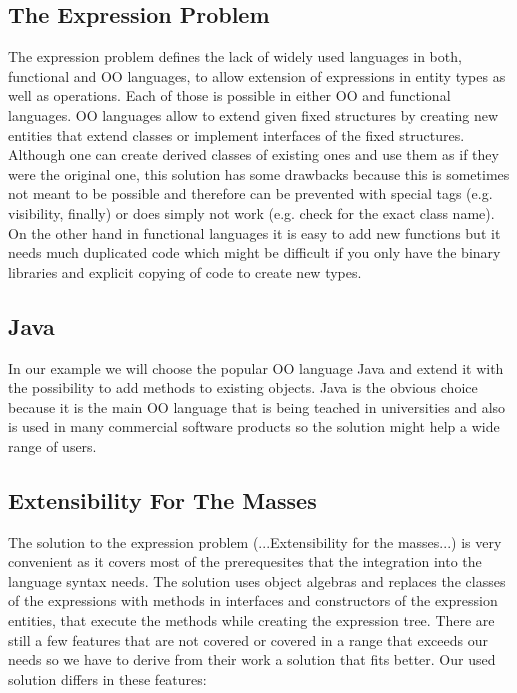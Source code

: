 \documentclass{report}
\begin{document}
\subsection{The Expression Problem}

The expression problem defines the lack of widely used languages in both, functional and OO languages, to allow extension of expressions in entity types as well as operations. Each of those is possible in either OO and functional languages. OO languages allow to extend given fixed structures by creating new entities that extend classes or implement interfaces of the fixed structures. Although one can create derived classes of existing ones and use them as if they were the original one, this solution has some drawbacks because this is sometimes not meant to be possible and therefore can be prevented with special tags (e.g. visibility, finally) or does simply not work (e.g. check for the exact class name). On the other hand in functional languages it is easy to add new functions but it needs much duplicated code which might be difficult if you only have the binary libraries and explicit copying of code to create new types.

\subsection{Java}

In our example we will choose the popular OO language Java and extend it with the possibility to add methods to existing objects. Java is the obvious choice because it is the main OO language that is being teached in universities and also is used in many commercial software products so the solution might help a wide range of users.

\subsection{Extensibility For The Masses}

The solution to the expression problem (...Extensibility for the masses...) is very convenient as it covers most of the prerequesites that the integration into the language syntax needs. The solution uses object algebras and replaces the classes of the expressions with methods in interfaces and constructors of the expression entities, that execute the methods while creating the expression tree. There are still a few features that are not covered or covered in a range that exceeds our needs so we have to derive from their work a solution that fits better. Our used solution differs in these features:
\end{document}
